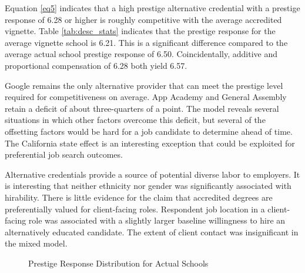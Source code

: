 \documentclass[review]{elsarticle}
\begin{document}
Equation \ref{eq5} indicates that a high prestige alternative credential with a
prestige response of 6.28 or higher is roughly competitive with the average accredited vignette.
Table \ref{tab:desc_stats} indicates that the prestige response for the average vignette school is 6.21.
This is a significant difference compared to the average actual school prestige response of 6.50.
Coincidentally, additive and proportional compensation of 6.28 both yield 6.57.

Google remains the only alternative provider that can meet the prestige level required
for competitiveness on average.
App Academy and General Assembly retain a deficit of about three-quarters of a point.
The model reveals several situations in which other factors overcome this deficit,
but several of the offsetting factors would be hard for a job candidate to determine ahead of time.
The California state effect is an interesting exception that could be exploited
for preferential job search outcomes.

Alternative credentials provide a source of potential diverse labor to employers.
It is interesting that neither ethnicity nor gender was significantly associated with hirability.
There is little evidence for the claim that accredited degrees are preferentially valued for client-facing roles.
Respondent job location in a client-facing role was associated with a slightly larger
baseline willingness to hire an alternatively educated candidate.
The extent of client contact was insignificant in the mixed model.

\begin{figure}[h!]
    \centering
    \caption{Prestige Response Distribution for Actual Schools}
    \label{fig:var_results}
\end{figure}
\end{document}
